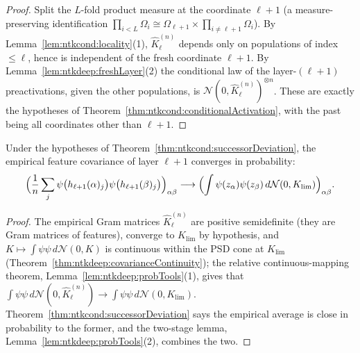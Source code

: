\begin{proof}
  \leanok
Split the $L$-fold product measure at the coordinate $\ell+1$ (a measure-preserving identification $\prod_{i<L}\Omega_i\cong\Omega_{\ell+1}\times\prod_{i\ne\ell+1}\Omega_i$). By Lemma~\ref{lem:ntkcond:locality}(1), $\hat K^{(n)}_\ell$ depends only on populations of index $\le\ell$, hence is independent of the fresh coordinate $\ell+1$. By Lemma~\ref{lem:ntkdeep:freshLayer}(2) the conditional law of the layer-$(\ell+1)$ preactivations, given the other populations, is $\mathcal N(0,\hat K^{(n)}_\ell)^{\otimes n}$. These are exactly the hypotheses of Theorem~\ref{thm:ntkcond:conditionalActivation}, with the past being all coordinates other than $\ell+1$.
\end{proof}

\begin{theorem}\label{thm:ntkcond:successorFeature}
  \leanok
Under the hypotheses of Theorem~\ref{thm:ntkcond:successorDeviation}, the empirical feature covariance of layer $\ell+1$ converges in probability:
\[
  \Bigl(\frac1n\sum_j\psi\bigl(h_{\ell+1}(\alpha)_j\bigr)\psi\bigl(h_{\ell+1}(\beta)_j\bigr)\Bigr)_{\alpha\beta}\longrightarrow\Bigl(\int\psi(z_\alpha)\psi(z_\beta)\,d\mathcal N(0,K_{\lim})\Bigr)_{\alpha\beta}.
\]
\end{theorem}

\begin{proof}
  \leanok
The empirical Gram matrices $\hat K^{(n)}_\ell$ are positive semidefinite (they are Gram matrices of features), converge to $K_{\lim}$ by hypothesis, and $K\mapsto\int\psi\psi\,d\mathcal N(0,K)$ is continuous within the PSD cone at $K_{\lim}$ (Theorem~\ref{thm:ntkdeep:covarianceContinuity}); the relative continuous-mapping theorem, Lemma~\ref{lem:ntkdeep:probTools}(1), gives that $\int\psi\psi\,d\mathcal N(0,\hat K^{(n)}_\ell)\to\int\psi\psi\,d\mathcal N(0,K_{\lim})$. Theorem~\ref{thm:ntkcond:successorDeviation} says the empirical average is close in probability to the former, and the two-stage lemma, Lemma~\ref{lem:ntkdeep:probTools}(2), combines the two.
\end{proof}

